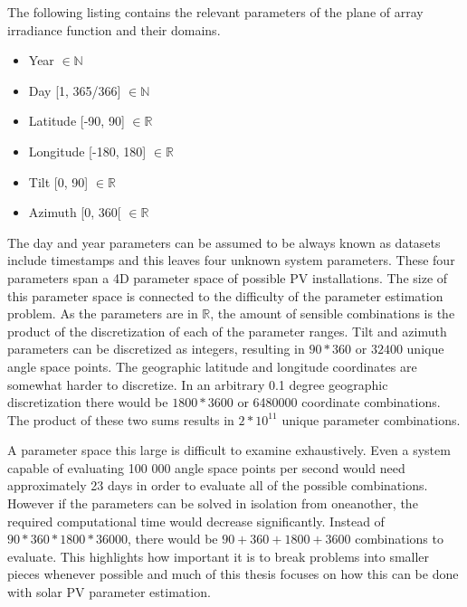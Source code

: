 \noindent The following listing contains the relevant parameters of the plane of array irradiance function and their domains.

\begin{itemize}
	\item Year $\in \mathbb{N}$
	\item Day [1, 365/366] $\in \mathbb{N}$
	\item Latitude [-90, 90] $\in \mathbb{R}$%
	\item Longitude [-180, 180]  $\in \mathbb{R}$%
  	\item Tilt [0, 90] $\in \mathbb{R}$
  	\item Azimuth [0, 360[ $\in \mathbb{R}$
\end{itemize}


\vspace{3mm}
\noindent
The day and year parameters can be assumed to be always known as datasets include timestamps and this leaves four unknown system parameters. These four parameters span a 4D parameter space of possible PV installations. The size of this parameter space is connected to the difficulty of the parameter estimation problem. As the parameters are in $\mathbb{R}$, the amount of sensible combinations is the product of the discretization of each of the parameter ranges. Tilt and azimuth parameters can be discretized as integers, resulting in $90*360$ or $32400$ unique angle space points. The geographic latitude and longitude coordinates are somewhat harder to discretize. In an arbitrary 0.1 degree geographic discretization there would be $1800*3600$ or 6480000 coordinate combinations. The product of these two sums results in $2*10^{11}$ unique parameter combinations.

A parameter space this large is difficult to examine exhaustively. Even a system capable of evaluating 100 000 angle space points per second would need approximately 23 days in order to evaluate all of the possible combinations. However if the parameters can be solved in isolation from oneanother, the required computational time would decrease significantly. Instead of $90*360*1800*36000$, there would be $90+360+1800+3600$ combinations to evaluate. This highlights how important it is to break problems into smaller pieces whenever possible and much of this thesis focuses on how this can be done with solar PV parameter estimation. 


